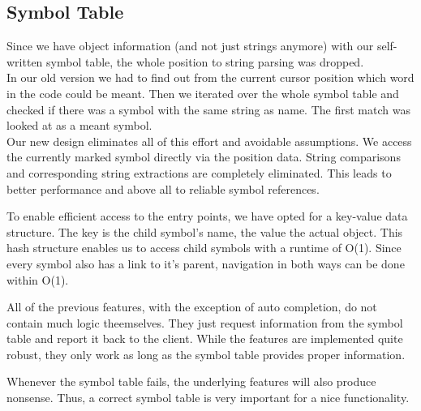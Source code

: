 \subsection{Symbol Table}

Since we have object information (and not just strings anymore) with our self-written symbol table,
the whole position to string parsing was dropped. \\

In our old version we had to find out from the current cursor position which word in the code could be meant.
Then we iterated over the whole symbol table and checked if there was a symbol with the same string as name.
The first match was looked at as a meant symbol. \\

Our new design eliminates all of this effort and avoidable assumptions.
We access the currently marked symbol directly via the position data.
String comparisons and corresponding string extractions are completely eliminated.
This leads to better performance and above all to reliable symbol references.

To enable efficient access to the entry points, we have opted for a key-value data structure.
The key is the child symbol's name, the value the actual  object.
This hash structure enables us to access child symbols with a runtime of O(1).
Since every symbol also has a link to it's parent, navigation in both ways can be done within O(1).


All of the previous features, with the exception of auto completion, do not contain much logic theemselves.
They just request information from the symbol table and report it back to the client.
While the features are implemented quite robust, they only work as long as the symbol table provides proper information.

Whenever the symbol table fails, the underlying features will also produce nonsense.
Thus, a correct symbol table is very important for a nice functionality.

